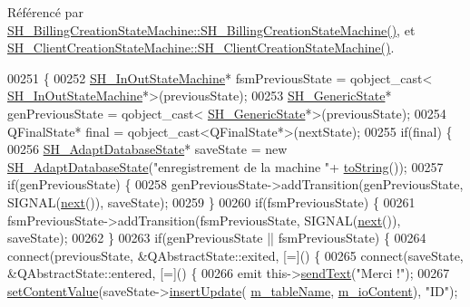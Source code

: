 Référencé par \hyperlink{classSH__BillingCreationStateMachine_ad62b77fa4aeafe200056ff3974562f83}{S\-H\-\_\-\-Billing\-Creation\-State\-Machine\-::\-S\-H\-\_\-\-Billing\-Creation\-State\-Machine()}, et \hyperlink{classSH__ClientCreationStateMachine_a0b406b0f404c0fd33bf35be8ce0cc811}{S\-H\-\_\-\-Client\-Creation\-State\-Machine\-::\-S\-H\-\_\-\-Client\-Creation\-State\-Machine()}.


\begin{DoxyCode}
00251 \{
00252     \hyperlink{classSH__InOutStateMachine}{SH\_InOutStateMachine}* fsmPreviousState = qobject\_cast<
      \hyperlink{classSH__InOutStateMachine}{SH\_InOutStateMachine}*>(previousState);
00253     \hyperlink{classSH__GenericState}{SH\_GenericState}* genPreviousState = qobject\_cast<
      \hyperlink{classSH__GenericState}{SH\_GenericState}*>(previousState);
00254     QFinalState* \textcolor{keyword}{final} = qobject\_cast<QFinalState*>(nextState);
00255     \textcolor{keywordflow}{if}(\textcolor{keyword}{final}) \{
00256         \hyperlink{classSH__AdaptDatabaseState}{SH\_AdaptDatabaseState}* saveState = \textcolor{keyword}{new} 
      \hyperlink{classSH__AdaptDatabaseState}{SH\_AdaptDatabaseState}(\textcolor{stringliteral}{"enregistrement de la machine "}+
      \hyperlink{classSH__InOutStateMachine_a60ecd7de03d948e2d1e9cbedb5c3e5fa}{toString}());
00257         \textcolor{keywordflow}{if}(genPreviousState) \{
00258             genPreviousState->addTransition(genPreviousState, SIGNAL(\hyperlink{classSH__InOutStateMachine_aa9ee51efe0e17dcf5366c8a97b523892}{next}()), saveState);
00259         \}
00260         \textcolor{keywordflow}{if}(fsmPreviousState) \{
00261             fsmPreviousState->addTransition(fsmPreviousState, SIGNAL(\hyperlink{classSH__InOutStateMachine_aa9ee51efe0e17dcf5366c8a97b523892}{next}()), saveState);
00262         \}
00263         \textcolor{keywordflow}{if}(genPreviousState || fsmPreviousState) \{
00264             connect(previousState, &QAbstractState::exited, [=]() \{
00265                 connect(saveState, &QAbstractState::entered, [=]() \{
00266                     emit this->\hyperlink{classSH__InOutStateMachine_ae2cbbe3cd207158668dcb4838938c7ad}{sendText}(\textcolor{stringliteral}{"Merci !"});
00267                     \hyperlink{classSH__InOutStateMachine_aa2766b7a7ba39c35a10df7fc0c151b4f}{setContentValue}(saveState->\hyperlink{classSH__AdaptDatabaseState_ab010e64da052db416328d3bcb9ca01d4}{insertUpdate}(
      \hyperlink{classSH__InOutStateMachine_acc0f5d5133af2dcca30939f53ec8837b}{m\_tableName}, \hyperlink{classSH__InOutStateMachine_a661a1c7bd3b1086b3b5cd60ca957ecbd}{m\_ioContent}), \textcolor{stringliteral}{"ID"});

\end{DoxyCode}
